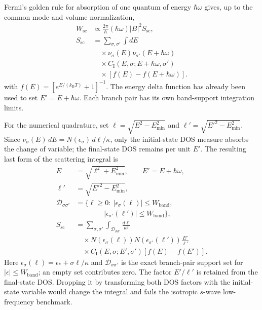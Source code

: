 \documentclass[aps,prb,reprint,superscriptaddress]{revtex4-2}
\newcommand{\kb}{k_{\mathrm B}}
\newcommand{\Wsc}{W_{\mathrm{sc}}}
\begin{document}
Fermi's golden rule for absorption of one quantum of energy $\hbar\omega$ gives, up to the common mode and volume normalization,
\begin{equation}
\begin{aligned}
 \Wsc &\propto \frac{2\pi}{\hbar}(\hbar\omega)|B|^2 S_{\mathrm{sc}},\\
 S_{\mathrm{sc}}&=\sum_{\sigma,\sigma'}\int dE\\
 &\quad\times\nu_\sigma(E)\nu_{\sigma'}(E+\hbar\omega)\\
 &\quad\times C_{\mathrm I}(E,\sigma;E+\hbar\omega,\sigma')\\
 &\quad\times[f(E)-f(E+\hbar\omega)].
\end{aligned}
\label{eq:scattering-integral}
\end{equation}
with $f(E)=[e^{E/(\kb T)}+1]^{-1}$. The energy delta function has already been used to set $E'=E+\hbar\omega$. Each branch pair has its own band-support integration limits.

For the numerical quadrature, set $\ell=\sqrt{E^2-E_{\min}^2}$ and $\ell'=\sqrt{E'^2-E_{\min}^2}$. Since $\nu_\sigma(E)\,dE=N(\epsilon_\sigma)\,d\ell/\kappa$, only the initial-state DOS measure absorbs the change of variable; the final-state DOS remains per unit $E'$. The resulting last form of the scattering integral is
\begin{equation}
\begin{aligned}
 E&=\sqrt{\ell^2+E_{\min}^2},\qquad E'=E+\hbar\omega,\\
 \ell'&=\sqrt{E'^2-E_{\min}^2},\\
 \mathcal{D}_{\sigma\sigma'}&=\{\ell\geq0:\ |\epsilon_\sigma(\ell)|\leq W_{\mathrm{band}},\\
 &\qquad\qquad |\epsilon_{\sigma'}(\ell')|\leq W_{\mathrm{band}}\},\\
 S_{\mathrm{sc}}&=\sum_{\sigma,\sigma'}\int_{\mathcal{D}_{\sigma\sigma'}}\frac{d\ell}{\kappa^2}\\
 &\quad\times N\!\left(\epsilon_\sigma(\ell)\right)
 N\!\left(\epsilon_{\sigma'}(\ell')\right)\frac{E'}{\ell'}\\
 &\quad\times C_{\mathrm I}(E,\sigma;E',\sigma')[f(E)-f(E')].
\end{aligned}
\label{eq:ell-integral}
\end{equation}
Here $\epsilon_\sigma(\ell)=\epsilon_*+\sigma\ell/\kappa$ and $\mathcal{D}_{\sigma\sigma'}$ is the exact branch-pair support set for $|\epsilon|\leq W_{\mathrm{band}}$; an empty set contributes zero. The factor $E'/\ell'$ is retained from the final-state DOS. Dropping it by transforming both DOS factors with the initial-state variable would change the integral and fails the isotropic $s$-wave low-frequency benchmark.
\end{document}
